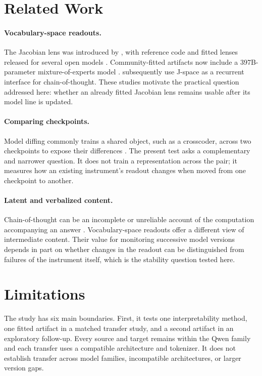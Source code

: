\documentclass[10pt,a4paper,twocolumn]{article}
\begin{document}
\section{Related Work}

\paragraph{Vocabulary-space readouts.}
The Jacobian lens was introduced by \citet{gurnee2026workspace}, with
reference code and fitted lenses released for several open models
\citep{neuronpedia2026lens}. Community-fitted artifacts now include a
397B-parameter mixture-of-experts model \citep{praxagent2026lens397}.
\citet{wu2026jcot} subsequently use J-space as a recurrent interface for
chain-of-thought. These studies motivate the practical question addressed
here: whether an already fitted Jacobian lens remains usable after its model
line is updated.

\paragraph{Comparing checkpoints.}
Model diffing commonly trains a shared object, such as a crosscoder, across
two checkpoints to expose their differences \citep{lindsey2024crosscoders}.
The present test asks a complementary and narrower question. It does not
train a representation across the pair; it measures how an existing
instrument's readout changes when moved from one checkpoint to another.

\paragraph{Latent and verbalized content.}
Chain-of-thought can be an incomplete or unreliable account of the
computation accompanying an answer \citep{lanham2023faithfulness,
arcuschin2025faithful}. Vocabulary-space readouts offer a different view of
intermediate content. Their value for monitoring successive model versions
depends in part on whether changes in the readout can be distinguished from
failures of the instrument itself, which is the stability question tested
here.

\section{Limitations}
\label{sec:limits}

The study has six main boundaries. First, it tests one interpretability
method, one fitted artifact in a matched transfer study, and a second artifact
in an exploratory follow-up. Every source and target remains within the Qwen
family and each transfer uses a compatible architecture and tokenizer. It
does not establish transfer across model families, incompatible
architectures, or larger version gaps.
\end{document}
